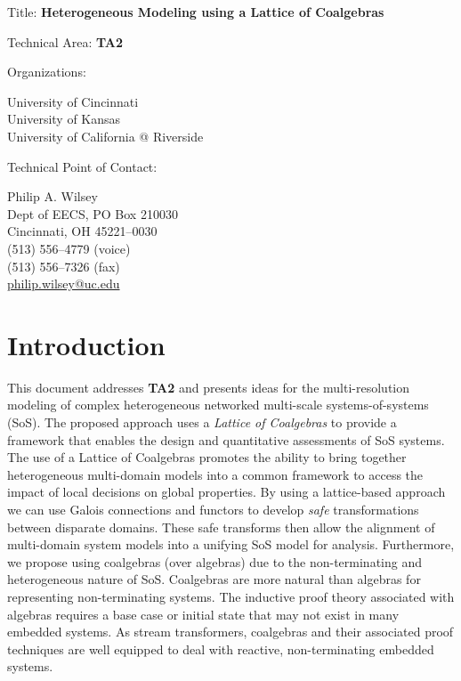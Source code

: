 \documentclass[12pt]{article}
\begin{document}
\noindent
{\Large Title: \textbf{Heterogeneous Modeling using a Lattice of Coalgebras}}

\bigskip
\bigskip
\bigskip
\bigskip
\bigskip

\noindent
Technical Area: \textbf{TA2}

\bigskip
\bigskip
\bigskip
\bigskip

\noindent
Organizations: \begin{minipage}[t]{4in}
  \textsf{University of Cincinnati} \\
  \textsf{University of Kansas} \\
  \textsf{University of California @ Riverside}
\end{minipage}

\bigskip
\bigskip
\bigskip
\bigskip

\noindent
Technical Point of Contact: \begin{minipage}[t]{4in}
  Philip A. Wilsey \\
  Dept of EECS, PO Box 210030 \\
  Cincinnati, OH 45221--0030 \\
  (513) 556--4779 (voice) \\
  (513) 556--7326 (fax) \\
  \url{philip.wilsey@uc.edu}
\end{minipage}

\clearpage

\section{Introduction}

This document addresses \textbf{TA2} and presents ideas for the multi-resolution modeling
of complex heterogeneous networked multi-scale systems-of-systems (SoS).  The proposed
approach uses a \emph{Lattice of Coalgebras} to provide a framework that enables the
design and quantitative assessments of SoS systems.  The use of a Lattice of Coalgebras
promotes the ability to bring together heterogeneous multi-domain models into a common
framework to access the impact of local decisions on global properties.  By using a
lattice-based approach we can use Galois connections and functors to develop \emph{safe}
transformations between disparate domains.  These safe transforms then allow the alignment
of multi-domain system models into a unifying SoS model for analysis.  Furthermore, we
propose using coalgebras (over algebras) due to the non-terminating and heterogeneous
nature of SoS.  Coalgebras are more natural than algebras for representing non-terminating
systems.  The inductive proof theory associated with algebras requires a base case or
initial state that may not exist in many embedded systems.  As stream transformers,
coalgebras and their associated proof techniques are well equipped to deal with reactive,
non-terminating embedded systems.
\end{document}

